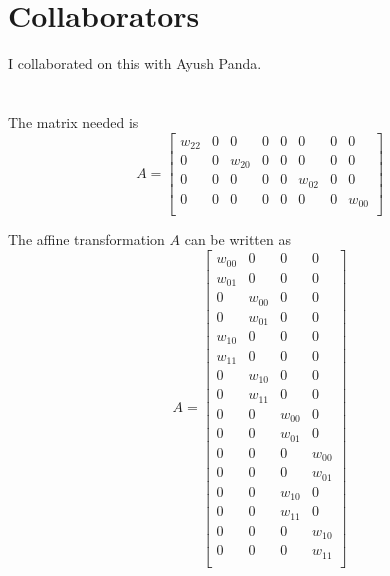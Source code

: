 \documentclass[twoside]{article}
\begin{document}
\section{Collaborators}
I collaborated on this with Ayush Panda.

\section{}
The matrix needed is
\begin{equation*}
	A =
	\begin{bmatrix}
		w_{22} & 0 & 0      & 0 & 0 & 0      & 0 & 0      \\
		0      & 0 & w_{20} & 0 & 0 & 0      & 0 & 0      \\
		0      & 0 & 0      & 0 & 0 & w_{02} & 0 & 0      \\
		0      & 0 & 0      & 0 & 0 & 0      & 0 & w_{00} \\
	\end{bmatrix}
\end{equation*}

The affine transformation $A$ can be written as
\begin{equation*}
	A =
	\begin{bmatrix}
		w_{00} & 0      & 0      & 0      \\
		w_{01} & 0      & 0      & 0      \\
		0      & w_{00} & 0      & 0      \\
		0      & w_{01} & 0      & 0      \\
		w_{10} & 0      & 0      & 0      \\
		w_{11} & 0      & 0      & 0      \\
		0      & w_{10} & 0      & 0      \\
		0      & w_{11} & 0      & 0      \\
		0      & 0      & w_{00} & 0      \\
		0      & 0      & w_{01} & 0      \\
		0      & 0      & 0      & w_{00} \\
		0      & 0      & 0      & w_{01} \\
		0      & 0      & w_{10} & 0      \\
		0      & 0      & w_{11} & 0      \\
		0      & 0      & 0      & w_{10} \\
		0      & 0      & 0      & w_{11} \\
	\end{bmatrix}
\end{equation*}
\end{document}
